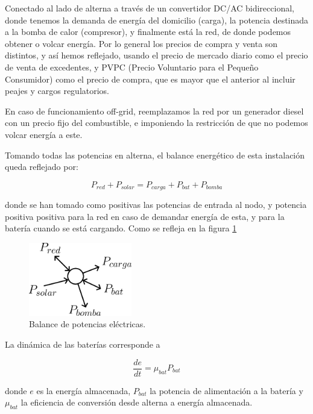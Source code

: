 Conectado al lado de alterna a través de un convertidor DC/AC bidireccional,
donde tenemos la demanda de energía del domicilio (carga), la potencia
destinada a la bomba de calor (compresor), y finalmente está la red, de donde
podemos obtener o volcar energía. Por lo general los precios de compra y venta
son distintos, y así hemos reflejado, usando el precio de mercado diario como
el precio de venta de excedentes, y PVPC (Precio Voluntario para el Pequeño
Consumidor) como el precio de compra, que es mayor que el anterior al incluir
peajes y cargos regulatorios.

En caso de funcionamiento off-grid, reemplazamos la red por un generador diesel
con un precio fijo del combustible, e imponiendo la restricción de que no
podemos volcar energía a este.


Tomando todas las potencias en alterna, el balance energético de esta
instalación queda reflejado por:

\begin{equation}
	P_{red} + P_{solar} = P_{carga} + P_{bat} + P_{bomba}
\end{equation}

donde se han tomado como positivas las potencias de entrada al nodo, y potencia
positiva positiva para la red en caso de demandar energía de esta, y para la
batería cuando se está cargando. Como se refleja en la figura
\ref{fig:electric_node}

\begin{figure}[h] \centering
	\centering
	\includegraphics[width=0.4\textwidth]{./capitulos/resultados_discusion/images/electric_node.png}
	\caption{Balance de potencias eléctricas.}
	\label{fig:electric_node}
\end{figure}

La dinámica de las baterías corresponde a

\begin{equation}
	\frac{de}{dt} = \mu_{bat} P_{bat}
\end{equation}

donde $e$ es la energía almacenada, $P_{bat}$ la potencia de alimentación a la
batería y $\mu_{bat}$ la eficiencia de conversión desde alterna a energía
almacenada.

